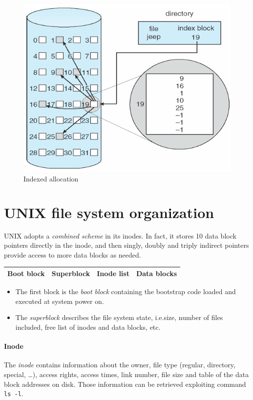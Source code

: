 \documentclass{report}
\begin{document}
\begin{figure}[hbtp]
\centering
\includegraphics[scale=0.35]{images/file_system/indexed_allocation.png}
\caption{Indexed allocation}
\end{figure}

\section{UNIX file system organization}
UNIX adopts a \emph{combined scheme} in its inodes. In fact, it stores 10 data block pointers directly in the inode, and then singly, doubly and triply indirect pointers provide access to more data blocks as needed.

\begin{center}
\begin{tabular}{|c|c|c|c|}
\hline 
Boot block & Superblock & Inode list & Data blocks \\ 
\hline 
\end{tabular} 
\end{center}

\begin{itemize}
\item The first block is the \emph{boot block} containing the bootstrap code loaded and executed at system power on.
\item The \emph{superblock} describes the file system state, i.e.\@ size, number of files included, free list of inodes and data blocks, etc.
\end{itemize}

\paragraph{Inode} The \emph{inode} contains information about the owner, file type (regular, directory, special, \dots), access rights, access times, link number, file size and table of the data block addresses on disk. Those information can be retrieved exploiting command \texttt{ls -l}.
\end{document}
